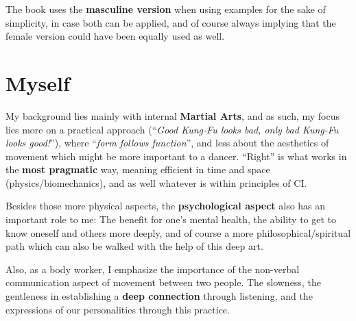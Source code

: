 The book uses the \textbf{masculine version} when using examples for the sake of simplicity, in case both can be applied, and of course always implying that the female version could have been equally used as well.

\section{Myself}\label{sec:myself}

My background lies mainly with internal \textbf{Martial Arts}, and as such, my focus lies more on a practical approach (``\textit{Good Kung-Fu looks bad, only bad Kung-Fu looks good!}''), where ``\textit{form follows function}'', and less about the aesthetics of movement which might be more important to a dancer.
``Right'' is what works in the \textbf{most pragmatic} way, meaning efficient in time and space (physics/biomechanics), and as well whatever is within principles of CI.

Besides those more physical aspects, the \textbf{psychological aspect} also has an important role to me: The benefit for one's mental health, the ability to get to know oneself and others more deeply, and of course a more philosophical/spiritual path which can also be walked with the help of this deep art.

Also, as a body worker, I emphasize the importance of the non-verbal communication aspect of movement between two people.
The slowness, the gentleness in establishing a \textbf{deep connection} through listening, and the expressions of our personalities through this practice.
